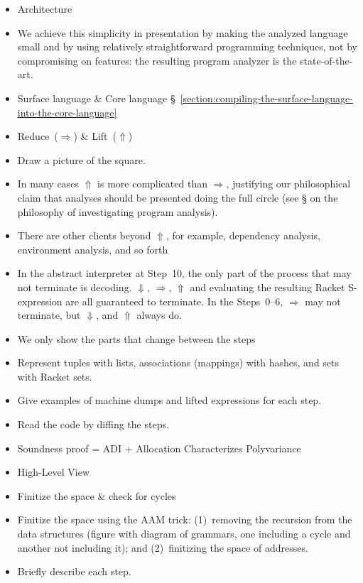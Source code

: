 \documentclass[12pt, oneside]{book}
\begin{document}
\begin{itemize}
  \item Architecture
  \item  We achieve this simplicity in presentation by making the analyzed language small and by using relatively straightforward programming techniques, not by compromising on features: the resulting program analyzer is the state-of-the-art.
  \item Surface language \& Core language §~\ref{section:compiling-the-surface-language-into-the-core-language}
  \item Reduce~(\(⇒\)) \& Lift~(\(⇑\))
  \item Draw a picture of the square.
  \item In many cases \(⇑\) is more complicated than \(⇒\), justifying our philosophical claim that analyses should be presented doing the full circle (see § on the philosophy of investigating program analysis).
  \item There are other clients beyond \(⇑\), for example, dependency analysis, environment analysis, and so forth
  \item In the abstract interpreter at Step~10, the only part of the process that may not terminate is decoding. \(⇓\), \(⇒\), \(⇑\) and evaluating the resulting Racket S-expression are all guaranteed to terminate. In the Steps~0–6, \(⇒\) may not terminate, but \(⇓\), and \(⇑\) always do.
  \item We only show the parts that change between the steps
  \item Represent tuples with lists, associations (mappings) with hashes, and sets with Racket sets.
  \item Give examples of machine dumps and lifted expressions for each step.
  \item Read the code by diffing the steps.
  \item Soundness proof = ADI + Allocation Characterizes Polyvariance
\end{itemize}

\begin{itemize}
  \item High-Level View
  \item Finitize the space \& check for cycles
  \item Finitize the space using the AAM trick: (1)~removing the recursion from the data structures (figure with diagram of grammars, one including a cycle and another not including it); and (2)~finitizing the space of addresses.
  \item Briefly describe each step.
\end{itemize}
\end{document}
